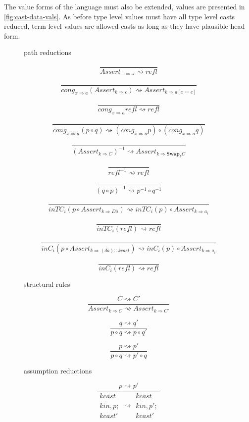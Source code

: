 The value forms of the language must also be extended, values are
presented in \ref{fig:cast-data-vals}. As before type level values
must have all type level casts reduced, term level values are allowed
casts as long as they have plausible head form.

\begin{figure}
path reductions

\[
\frac{\ }{Assert_{-\Rightarrow\star}\rightsquigarrow refl}
\]

\[
\frac{\ }{cong_{x\Rightarrow a}\left(Assert_{k\Rightarrow c}\right)\rightsquigarrow Assert_{k\Rightarrow a\left[x\coloneqq c\right]}}
\]

\[
\frac{\ }{cong_{x\Rightarrow a}refl\rightsquigarrow refl}
\]

\[
\frac{\ }{cong_{x\Rightarrow a}\left(p\circ q\right)\rightsquigarrow\left(cong_{x\Rightarrow a}p\right)\circ\left(cong_{x\Rightarrow a}q\right)}
\]

\[
\frac{\ }{\left(Assert_{k\Rightarrow C}\right)^{-1}\rightsquigarrow Assert_{k\Rightarrow\mathbf{Swap}_{k}C}}
\]

\[
\frac{\quad}{refl^{-1}\rightsquigarrow refl}
\]

\[
\frac{\quad}{\left(q\circ p\right)^{-1}\rightsquigarrow p^{-1}\circ q^{-1}}
\]

\[
\frac{\ }{inTC_{i}\left(p\circ Assert_{k\Rightarrow D\overline{a}}\right)\rightsquigarrow inTC_{i}\left(p\right)\circ Assert_{k\Rightarrow a_{i}}}
\]

\[
\frac{\ }{inTC_{i}\left(refl\right)\rightsquigarrow refl}
\]

\[
\frac{\ }{inC_{i}\left(p\circ Assert_{k\Rightarrow\left(d\overline{a}\right)::kcast}\right)\rightsquigarrow inC_{i}\left(p\right)\circ Assert_{k\Rightarrow a_{i}}}
\]


\[
\frac{\ }{inC_{i}\left(refl\right)\rightsquigarrow refl}
\]

structural rules

\[
\frac{C\rightsquigarrow C'}{Assert_{k\Rightarrow C}\rightsquigarrow Assert_{k\Rightarrow C'}}
\]

\[
\frac{q\rightsquigarrow q'}{p\circ q\rightsquigarrow p\circ q'}
\]

\[
\frac{p\rightsquigarrow p'}{p\circ q\rightsquigarrow p'\circ q}
\]

assumption reductions

\[
\frac{p\rightsquigarrow p'}{\begin{array}{c}
kcast\\
\overline{kin,}p;\\
kcast'
\end{array}\rightsquigarrow\begin{array}{c}
kcast\\
\overline{kin,}p';\\
kcast'
\end{array}}
\]


\end{figure}
